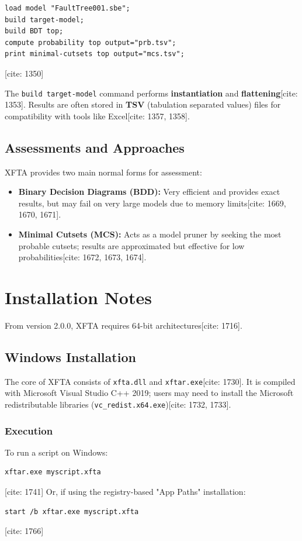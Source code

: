 \begin{lstlisting}[caption={XFTA assessment script}]
load model "FaultTree001.sbe";
build target-model;
build BDT top;
compute probability top output="prb.tsv";
print minimal-cutsets top output="mcs.tsv";
\end{lstlisting}
[cite: 1350]

The \texttt{build target-model} command performs \textbf{instantiation} and \textbf{flattening}[cite: 1353]. Results are often stored in \textbf{TSV} (tabulation separated values) files for compatibility with tools like Excel[cite: 1357, 1358].

\section{Assessments and Approaches}
XFTA provides two main normal forms for assessment:
\begin{itemize}
    \item \textbf{Binary Decision Diagrams (BDD):} Very efficient and provides exact results, but may fail on very large models due to memory limits[cite: 1669, 1670, 1671].
    \item \textbf{Minimal Cutsets (MCS):} Acts as a model pruner by seeking the most probable cutsets; results are approximated but effective for low probabilities[cite: 1672, 1673, 1674].
\end{itemize}

\chapter{Installation Notes}
From version 2.0.0, XFTA requires 64-bit architectures[cite: 1716].

\section{Windows Installation}
The core of XFTA consists of \texttt{xfta.dll} and \texttt{xftar.exe}[cite: 1730]. It is compiled with Microsoft Visual Studio C++ 2019; users may need to install the Microsoft redistributable libraries (\texttt{vc\_redist.x64.exe})[cite: 1732, 1733].

\subsection{Execution}
To run a script on Windows:
\begin{lstlisting}[numbers=none]
xftar.exe myscript.xfta
\end{lstlisting}
[cite: 1741]
Or, if using the registry-based "App Paths" installation:
\begin{lstlisting}[numbers=none]
start /b xftar.exe myscript.xfta
\end{lstlisting}
[cite: 1766]

